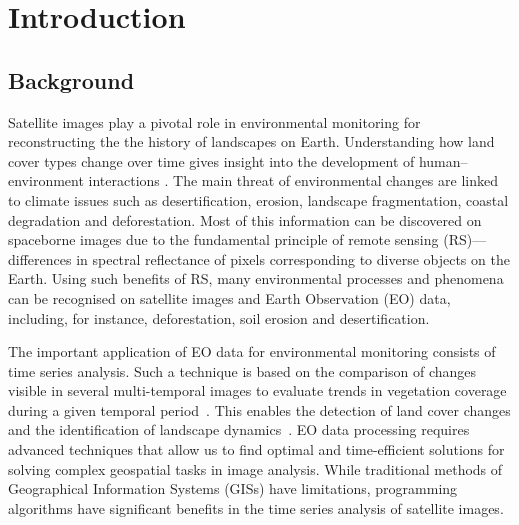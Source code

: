 \documentclass[jimaging,article,accept,pdftex,moreauthors]{Definitions/mdpi}
\begin{document}
\section{Introduction}\label{sec1}

\subsection{Background}

{Satellite images play a pivotal role in environmental monitoring for reconstructing the} the history of landscapes on Earth. Understanding how land cover types change over time gives{ }insight into {the development of }human--environment interactions \cite{Ndehedehe2022,Foli,Speranza}. The main threat of environmental {changes are} linked to climate issues such as desertification, erosion, landscape fragmentation, coastal degradation {and} deforestation. Most of this information {can be discovered on spaceborne images due to the fundamental principle of {remote sensing (RS)}---{differences in spectral reflectance of pixels corresponding to diverse objects on the Earth.} %
Using such benefits of RS, many} environmental processes and phenomena can be recognised on satellite images {and Earth Observation (EO) data}, including, for instance, deforestation, soil erosion and desertification. 

The important application of {EO} data for environmental monitoring consists of time series analysis. Such a technique is based on the comparison of changes visible in several multi-temporal images to evaluate trends in vegetation coverage during a given temporal \mbox{period \cite{Springer2023,10281679}}. {This enables the detection of land cover changes and} the identification of {landscape} \mbox{dynamics \cite{su13084092,NATARAJAN2016256}}. EO data processing requires advanced techniques that allow us to find optimal and time-efficient solutions for solving complex geospatial tasks in image analysis. While traditional methods {of Geographical Information Systems (GISs) }have limitations, programming algorithms have significant benefits in the time series analysis of satellite images.
\end{document}
